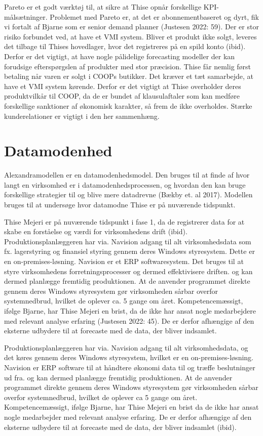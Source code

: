 \documentclass[
  12pt,
  a4paper,
  DIV=11,
  numbers=noendperiod]{scrartcl}
\begin{document}
Pareto er et godt værktøj til, at sikre at Thise opnår forskellige
KPI-målsætninger. Problemet med Pareto er, at det er abonnementbaseret
og dyrt, fik vi fortalt af Bjarne som er senior demand planner (Justesen
2022: 59). Der er stor risiko forbundet ved, at have et VMI system.
Bliver et produkt ikke solgt, leveres det tilbage til Thises hovedlager,
hvor det registreres på en spild konto (ibid). Derfor er det vigtigt, at
have nogle pålidelige forecasting modeller der kan forudsige
efterspørgslen af produkter med stor præcision. Thise får nemlig først
betaling når varen er solgt i COOPs butikker. Det kræver et tæt
samarbejde, at have et VMI system kørende. Derfor er det vigtigt at
Thise overholder deres produktvilkår til COOP, da de er bundet af
klausulaftaler som kan medføre forskellige sanktioner af økonomisk
karakter, så frem de ikke overholdes. Stærke kunderelationer er vigtigt
i den her sammenhæng.

\hypertarget{datamodenhed}{%
\section{Datamodenhed}\label{datamodenhed}}

Alexandramodellen er en datamodenhedsmodel. Den bruges til at finde af
hvor langt en virksomhed er i datamodenhedsprocessen, og hvordan den kan
bruge forskellige strategier til og blive mere datadrevne (Bækby et. al
2017). Modellen bruges til at undersøge hvor datamodne Thise er på
nuværende tidspunkt.

Thise Mejeri er på nuværende tidspunkt i fase 1, da de registrerer data
for at skabe en forståelse og værdi for virksomhedens drift (ibid).
Produktionsplanlæggeren har via. Navision adgang til alt virksomhedsdata
som fx. lagerstyring og finansiel styring gennem deres Windows
styresystem. Dette er en on-premises-løsning. Navision er et ERP
softwaresystem. Det bruges til at styre virksomhedens
forretningsprocesser og dermed effektivisere driften. og kan dermed
planlægge fremtidig produktionen. At de anvender programmet direkte
gennem deres Windows styresystem gør virksomheden sårbar overfor
systemnedbrud, hvilket de oplever ca. 5 gange om året.
Kompetencemæssigt, ifølge Bjarne, har Thise Mejeri en brist, da de ikke
har ansat nogle medarbejdere med relevant analyse erfaring (Justesen
2022: 45). De er derfor afhængige af den eksterne udbydere til at
forecaste med de data, der bliver indsamlet.

Produktionsplanlæggeren har via. Navision adgang til alt
virksomhedsdata, og det køres gennem deres Windows styresystem, hvilket
er en on-premises-løsning. Navision er ERP software til at håndtere
økonomi data til og træffe beslutninger ud fra. og kan dermed planlægge
fremtidig produktionen. At de anvender programmet direkte gennem deres
Windows styresystem gør virksomheden sårbar overfor systemnedbrud,
hvilket de oplever ca 5 gange om året. Kompetencemæssigt, ifølge Bjarne,
har Thise Mejeri en brist da de ikke har ansat nogle medarbejder med
relevant analyse erfaring. De er derfor afhængige af den eksterne
udbydere til at forecaste med de data, der bliver indsamlet (ibid).
\end{document}
